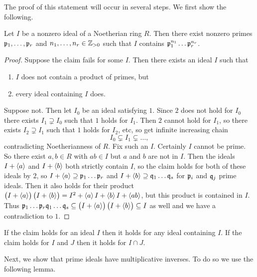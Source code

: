 
The proof of this statement will occur in several steps. We first show the following.

\begin{proposition}
Let $ I $ be a nonzero ideal of a Noetherian ring $ R $. Then there exist nonzero primes $ \mathfrak{p}_1, \dots, \mathfrak{p}_r $ and $ n_1, \dots, n_r \in \mathbb{Z}_{> 0} $ such that $ I $ contains $ \mathfrak{p}_1^{n_1} \dots \mathfrak{p}_r^{n_r} $.
\end{proposition}

\begin{proof}
Suppose the claim fails for some $ I $. Then there exists an ideal $ I $ such that
\begin{enumerate}
\item $ I $ does not contain a product of primes, but
\item every ideal containing $ I $ does.
\end{enumerate}
Suppose not. Then let $ I_0 $ be an ideal satisfying $ 1 $. Since $ 2 $ does not hold for $ I_0 $ there exists $ I_1 \supsetneq I_0 $ such that $ 1 $ holds for $ I_1 $. Then $ 2 $ cannot hold for $ I_1 $, so there exists $ I_2 \supsetneq I_1 $ such that $ 1 $ holds for $ I_2 $, etc, so get infinite increasing chain
$$ I_0 \subsetneq I_1 \subsetneq \dots, $$
contradicting Noetherianness of $ R $. Fix such an $ I $. Certainly $ I $ cannot be prime. So there exist $ a, b \in R $ with $ ab \in I $ but $ a $ and $ b $ are not in $ I $. Then the ideals $ I + \left\langle a \right\rangle $ and $ I + \left\langle b \right\rangle $ both strictly contain $ I $, so the claim holds for both of these ideals by $ 2 $, so $ I + \left\langle a \right\rangle \supseteq \mathfrak{p}_1 \dots \mathfrak{p}_r $ and $ I + \left\langle b \right\rangle \supseteq \mathfrak{q}_1 \dots \mathfrak{q}_s $ for $ \mathfrak{p}_i $ and $ \mathfrak{q}_j $ prime ideals. Then it also holds for their product $ \br{I + \abr{a}}\br{I + \abr{b}} = I^2 + \abr{a}I + \abr{b}I + \abr{ab} $, but this product is contained in $ I $. Thus $ \ppp_1 \dots \ppp_r\qqq_1 \dots \qqq_s \subseteq \br{I + \abr{a}}\br{I + \abr{b}} \subseteq I $ as well and we have a contradiction to $ 1 $.
\end{proof}

\pagebreak

\begin{note*}
If the claim holds for an ideal $ I $ then it holds for any ideal containing $ I $. If the claim holds for $ I $ and $ J $ then it holds for $ I \cap J $.
\end{note*}

Next, we show that prime ideals have multiplicative inverses. To do so we use the following lemma.

